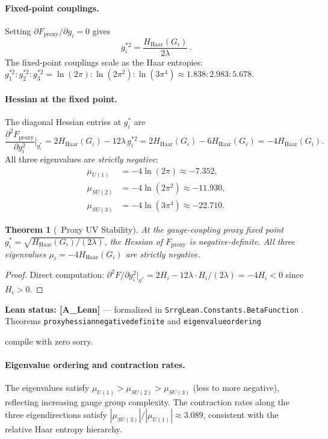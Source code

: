 \documentclass[11pt]{article}
\newtheorem{theorem}{Theorem}[section]
\theoremstyle{remark}
\newcommand{\SRRG}{\text{SRRG}}
\newcommand{\lean}[1]{%
  \penalty-100
  \begingroup
  \def\_{\textunderscore\allowbreak}%
  \texttt{#1}%
  \endgroup
}
\begin{document}
\begin{appendices}
\paragraph{Fixed-point couplings.}
Setting $\partial F_{\mathrm{proxy}}/\partial g_i = 0$ gives
\begin{equation}
  g_i^{*2} = \frac{H_{\mathrm{Haar}}(G_i)}{2\lambda}\,.
\end{equation}
The fixed-point couplings scale as the Haar entropies:
$g_1^{*2} : g_2^{*2} : g_3^{*2}
= \ln(2\pi) : \ln(2\pi^2) : \ln(3\pi^4)
\approx 1.838 : 2.983 : 5.678$.

\paragraph{Hessian at the fixed point.}
The diagonal Hessian entries at $g_i^*$ are
\[
  \frac{\partial^2 F_{\mathrm{proxy}}}{\partial g_i^2}\bigg|_{g_i^*}
  = 2 H_{\mathrm{Haar}}(G_i) - 12\lambda\, g_i^{*2}
  = 2 H_{\mathrm{Haar}}(G_i) - 6 H_{\mathrm{Haar}}(G_i)
  = -4 H_{\mathrm{Haar}}(G_i).
\]
All three eigenvalues are \emph{strictly negative}:
\begin{align*}
  \mu_{U(1)} &= -4\ln(2\pi) \approx -7.352, \\
  \mu_{SU(2)} &= -4\ln(2\pi^2) \approx -11.930, \\
  \mu_{SU(3)} &= -4\ln(3\pi^4) \approx -22.710.
\end{align*}

\begin{theorem}[\SRRG\ Proxy UV Stability]
\label{thm:uv_stable_app}
At the gauge-coupling proxy fixed point $g_i^* = \sqrt{H_{\mathrm{Haar}}(G_i)/(2\lambda)}$,
the Hessian of $F_{\mathrm{proxy}}$ is negative-definite.  All three eigenvalues
$\mu_i = -4H_{\mathrm{Haar}}(G_i)$ are strictly negative.
\end{theorem}

\begin{proof}
Direct computation: $\partial^2 F/\partial g_i^2\big|_{g^*} = 2H_i - 12\lambda\cdot H_i/(2\lambda)
= -4H_i < 0$ since $H_i > 0$.
\end{proof}

\textbf{Lean status: [A\_Lean]} --- formalized in
\lean{SrrgLean.Constants.BetaFunction}.  Theorems
\lean{proxy\_hessian\_negative\_definite} and \lean{eigenvalue\_ordering}
compile with zero sorry.

\paragraph{Eigenvalue ordering and contraction rates.}
The eigenvalues satisfy
$\mu_{U(1)} > \mu_{SU(2)} > \mu_{SU(3)}$ (less to more negative),
reflecting increasing gauge group complexity.  The contraction rates along the
three eigendirections satisfy $|\mu_{SU(3)}|/|\mu_{U(1)}| \approx 3.089$,
consistent with the relative Haar entropy hierarchy.


\end{appendices}
\end{document}
